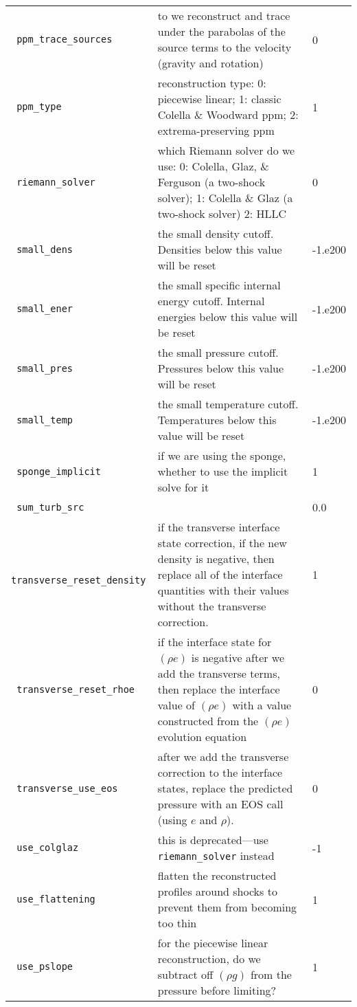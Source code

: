 \begin{landscape}
{\begin{center}
\begin{longtable}{|l|p{5.25in}|l|}
\rowcolor{tableShade}
\verb= ppm_trace_sources = &  to we reconstruct and trace under the parabolas of the source terms to the velocity (gravity and rotation) & 0 \\
\verb= ppm_type = &  reconstruction type: 0: piecewise linear; 1: classic Colella \& Woodward ppm; 2: extrema-preserving ppm & 1 \\
\rowcolor{tableShade}
\verb= riemann_solver = &  which Riemann solver do we use: 0: Colella, Glaz, \& Ferguson (a two-shock solver); 1: Colella \& Glaz (a two-shock solver) 2: HLLC & 0 \\
\verb= small_dens = &  the small density cutoff.  Densities below this value will be reset & -1.e200 \\
\rowcolor{tableShade}
\verb= small_ener = &  the small specific internal energy cutoff.  Internal energies below this value will be reset & -1.e200 \\
\verb= small_pres = &  the small pressure cutoff.  Pressures below this value will be reset & -1.e200 \\
\rowcolor{tableShade}
\verb= small_temp = &  the small temperature cutoff.  Temperatures below this value will be reset & -1.e200 \\
\verb= sponge_implicit = &  if we are using the sponge, whether to use the implicit solve for it & 1 \\
\rowcolor{tableShade}
\verb= sum_turb_src = &  & 0.0 \\
\verb= transverse_reset_density = &  if the transverse interface state correction, if the new density is negative, then replace all of the interface quantities with their values without the transverse correction. & 1 \\
\rowcolor{tableShade}
\verb= transverse_reset_rhoe = &  if the interface state for $(\rho e)$ is negative after we add the transverse terms, then replace the interface value of $(\rho e)$ with a value constructed from the $(\rho e)$ evolution equation & 0 \\
\verb= transverse_use_eos = &  after we add the transverse correction to the interface states, replace the predicted pressure with an EOS call (using $e$ and $\rho$). & 0 \\
\rowcolor{tableShade}
\verb= use_colglaz = &  this is deprecated---use {\tt riemann\_solver} instead & -1 \\
\verb= use_flattening = &  flatten the reconstructed profiles around shocks to prevent them from becoming too thin & 1 \\
\rowcolor{tableShade}
\verb= use_pslope = &  for the piecewise linear reconstruction, do we subtract off $(\rho g)$ from the pressure before limiting? & 1 \\



\end{longtable}
\end{center}}
\end{landscape}
